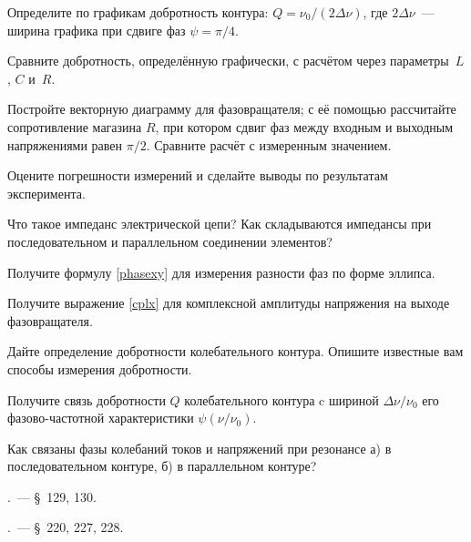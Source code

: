 \begin{lab:task}
Определите по графикам добротность контура: $Q=\nu_0/(2\Delta\nu)$, 
где $2\Delta\nu$~--- ширина графика при сдвиге фаз $\psi=\pi/4$.

\item Сравните добротность, определённую графически, с расчётом 
через параметры~$L$, $C$ и~$R$.

\item Постройте векторную диаграмму для фазовращателя; 
с её помощью рассчитайте сопротивление магазина $R$, при котором 
сдвиг фаз между входным и выходным напряжениями равен $\pi/2$. 
Сравните расчёт с измеренным значением.


\item Оцените погрешности измерений и 
сделайте выводы по результатам эксперимента.

\end{lab:task}


\begin{lab:questions}
	\item Что такое импеданс электрической цепи?
	Как складываются импедансы при последовательном и параллельном
соединении элементов?
    \item Получите формулу \eqref{phasexy} для измерения разности 
          фаз по форме эллипса.
    \item Получите выражение \eqref{cplx} для комплексной амплитуды напряжения на
    выходе фазовращателя.
    \item Дайте определение добротности колебательного контура.
    Опишите известные вам способы измерения добротности.
    \item Получите связь добротности $Q$ колебательного контура c шириной
    $\Delta \nu/\nu_0$ его фазово-частотной характеристики $\psi(\nu/\nu_0)$.
    \item Как связаны фазы колебаний токов и напряжений 
    при резонансе а) в последовательном контуре, б) в параллельном контуре?
\end{lab:questions}


\begin{lab:literature}
	\item \SivuhinIII.~--- \S~129, 130.
	\item \Kalashnikov.~--- \S~220, 227, 228.
\end{lab:literature}
